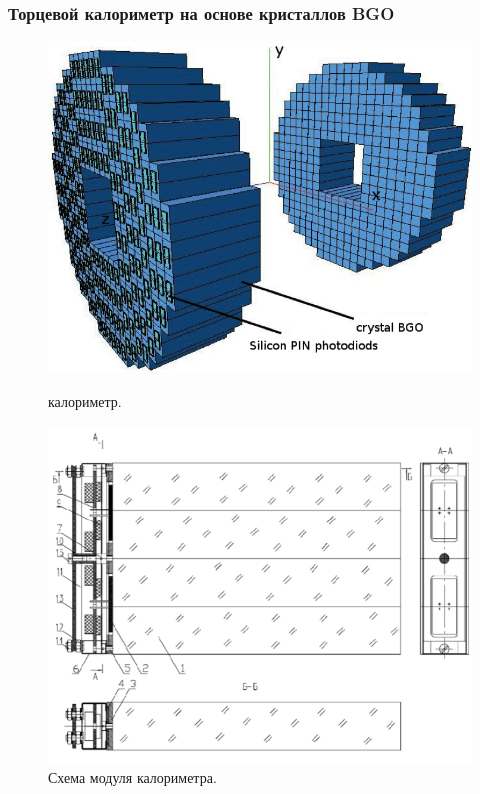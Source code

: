 
\subsubsection{Торцевой калориметр на основе кристаллов BGO}\label{sec:bgo}

\begin{figure}[htbp]
    \begin{minipage}[t]{0.475\textwidth}
        \centering
        \includegraphics[width=\textwidth]{img/cmd3_detector/bgo_scetch.png}
        \caption{ калориметр.}\label{fig:bgo_cal}
    \end{minipage}
    \hfill
    \begin{minipage}[t]{0.475\textwidth}
        \centering
        \includegraphics[width=\textwidth]{img/cmd3_detector/bgo_module_scheme.png}
        \caption{Схема модуля  калориметра.}\label{fig:bgo_cal_module_scheme}
  \end{minipage}
\end{figure}

